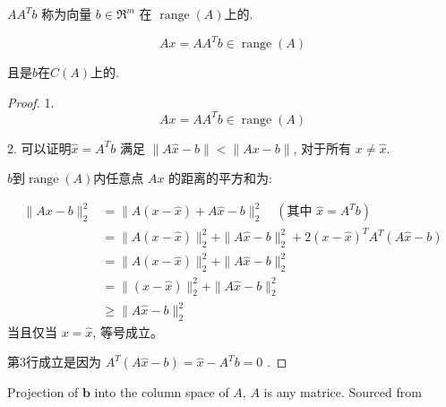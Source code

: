 $ A A^{T} b $ 称为向量 $  {b} \in \mathfrak{R}^{m} $ 在 $ \operatorname{range} (A)$上的.

\begin{theorem}
    \begin{equation} A x=A A^{T} b \in \operatorname{range}(A) \end{equation}

    且是$b$在$C(A)$上的.
\end{theorem}

\begin{proof}
    1.
    \begin{equation} A x=A A^{T} b \in \operatorname{range}(A) \end{equation}

    2. 可以证明$ \hat{x}=A^{T} b $ 满足 $ \|A \hat{x}-b\|<\|A x-b\| $, 对于所有 $ x \neq \hat{x} $.

    $b$到$\operatorname{range}(A)$内任意点 $ A x $ 的距离的平方和为:

    \begin{equation} \begin{aligned}\|A x-b\|_{2}^{2} &=\|A(x-\hat{x})+A \hat{x}-b\|_{2}^{2} \quad\left(\text {其中 } \hat{x}=A^{T} b\right) \\ &=\|A(x-\hat{x})\|_{2}^{2}+\|A \hat{x}-b\|_{2}^{2}+2(x-\hat{x})^{T} A^{T}(A \hat{x}-b) \\ &=\|A(x-\hat{x})\|_{2}^{2}+\|A \hat{x}-b\|_{2}^{2} \\ &=\|(x-\hat{x})\|_{2}^{2}+\|A \hat{x}-b\|_{2}^{2} \\ & \geq\|A \hat{x}-b\|_{2}^{2} \end{aligned} \end{equation}
当且仅当 $ x=\hat{x} $, 等号成立。

第3行成立是因为 $ A^{T}(A \hat{x}-b)=\hat{x}-A^{T} b=0 $ .
\end{proof}

\begin{FigureCenter}{Projection of $\boldsymbol{b}$ into the column space of ${A}$, $A$ is any matrice. Sourced from \cite{Strang1993IntroductionTL}}
    
\end{FigureCenter}


    
